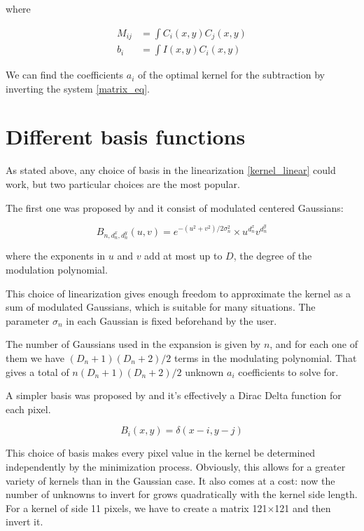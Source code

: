 where

\begin{align} \label{matrix_def}
M_{ij}  &=   \int  C_{i}(x,y)  C_{j}(x,y) \\
b_{i} &=  \int I(x,y) C_{i}(x,y)  \nonumber
\end{align}

We can find the coefficients $a_{i}$ of the optimal kernel for the subtraction by inverting the system \eqref{matrix_eq}.

\section{Different basis functions}

As stated above, any choice of basis in the linearization \eqref{kernel_linear} could work, but two particular choices are the most popular.

The first one was proposed by \citet{1998ApJ...503..325A} and it consist of modulated centered Gaussians:

\begin{equation}
B_{n,d_n^{x}, d_n^{y}}(u,v) = e^{-(u^2+v^2)/2 \sigma_n^2} \times u^{d_n^{x}} v^{d_n^{y}}
\end{equation}

where the exponents in $u$ and $v$ add at most up to $D$, the degree of the modulation polynomial.

This choice of linearization gives enough freedom to approximate the kernel as a sum of modulated Gaussians, which is suitable for many situations.
The parameter $\sigma_n$ in each Gaussian is fixed beforehand by the user.

The number of Gaussians used in the expansion is given by $n$, and for each one of them we have $(D_n + 1)(D_n + 2)/2$ terms in the modulating polynomial.
That gives a total of $n(D_n + 1)(D_n + 2)/2$ unknown $a_i$ coefficients to solve for.

A simpler basis was proposed by \citet{2008MNRAS.386L..77B} and it's effectively a Dirac Delta function for each pixel.

\begin{equation}
B_{i}(x,y) = \delta(x-i,y-j)
\end{equation}

This choice of basis makes every pixel value in the kernel be determined independently by the minimization process.
Obviously, this allows for a greater variety of kernels than in the Gaussian case.
It also comes at a cost: now the number of unknowns to invert for grows quadratically with the kernel side length.
For a kernel of side 11 pixels, we have to create a matrix 121$\times$121 and then invert it. 

